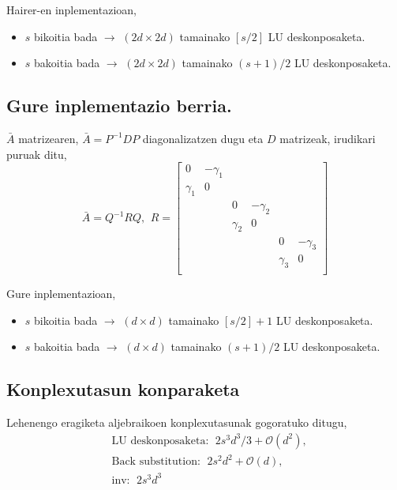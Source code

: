 Hairer-en inplementazioan,
\begin{itemize}
\item $s$ bikoitia bada $\rightarrow$ $(2d \times 2d)$ tamainako $[s/2]$  LU deskonposaketa.
\item $s$ bakoitia bada $\rightarrow$ $(2d \times 2d)$ tamainako $(s+1)/2$  LU deskonposaketa.
\end{itemize}

\subsection*{Gure inplementazio berria.}

$\bar{A}$ matrizearen, $\bar{A}=P^{-1}DP$ diagonalizatzen dugu eta $D$ matrizeak, irudikari puruak ditu,
\begin{equation*}
\bar{A}=Q^{-1}RQ, \ \,
R=\begin{bmatrix}
0           & -\gamma_{1}   &            &               &             &           \\
 \gamma_{1} & 0             &            &               &             &           \\
            &               & 0           & -\gamma_{2}  &             &           \\
            &               & \gamma_{2}  & 0              &           &           \\
            &               &             &                & 0            & -\gamma_{3} \\
            &               &             &                & \gamma_{3}   & 0            \\
\end{bmatrix}
\end{equation*}

Gure inplementazioan,
\begin{itemize}
\item $s$ bikoitia bada $\rightarrow$ $(d \times d)$ tamainako $[s/2]+1$  LU deskonposaketa.
\item $s$ bakoitia bada $\rightarrow$ $(d \times d)$ tamainako $(s+1)/2$  LU deskonposaketa.
\end{itemize}

\subsection*{Konplexutasun konparaketa}

Lehenengo eragiketa aljebraikoen konplexutasunak gogoratuko ditugu,
\begin{align*}
&\text{LU deskonposaketa}:  \ \ 2s^3d^3/3+\mathcal{O}(d^2), \\
&\text{Back substitution}:  \ \ 2s^2d^2+\mathcal{O}(d), \\
&\text{inv}: \ \ 2s^3d^3
\end{align*}

